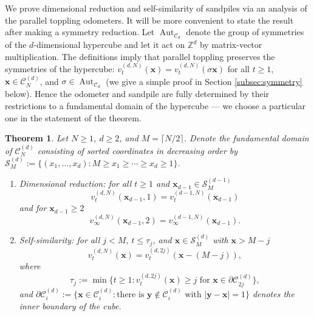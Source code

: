 \documentclass[12pt]{amsart}
\newtheorem{theorem}{Theorem}[section]
\newcommand{\Z}{\mathbb{Z}}
\begin{document}
	
	We prove dimensional reduction and self-similarity of sandpiles
	via an analysis of the parallel toppling odometers.  It will be more convenient to state the result after making a symmetry reduction. 
	 Let $\operatorname{Aut}_{\mathcal{C}_d}$ denote the group of symmetries of the $d$-dimensional hypercube and let it act on $\Z^d$ by matrix-vector multiplication.
	 The definitions imply that parallel toppling preserves the symmetries of the hypercube: 	$v_t^{(d,N)}(\mathbf{x}) = v_t^{(d,N)}( \sigma \mathbf{x})$ for all $t \geq 1$, $\mathbf{x} \in \mathcal{C}_N^{(d)}$, and $ \sigma \in \operatorname{Aut}_{\mathcal{C}_d}$ (we give a simple proof in Section \ref{subsec:symmetry} below).
	 Hence the odometer and sandpile are fully determined by their restrictions to
	a fundamental domain of the hypercube --- we choose a particular one in the statement of the theorem. 
	
	
	\begin{theorem}\label{the_theorem}
		Let $N \geq 1$, $d \geq 2$, and $M = \lceil N/2 \rceil$. Denote the fundamental domain of $\mathcal{C}_N^{(d)}$
		consisting of sorted coordinates in decreasing order by $\mathcal{S}^{(d)}_M := \{ (x_1, \ldots, x_d): M \geq x_1 \geq \cdots \geq x_d \geq 1 \}$.
		
		\begin{enumerate}
			\item{Dimensional reduction:} for all $t \geq 1$ and $\mathbf{x}_{d-1} \in \mathcal{S}_M^{(d-1)}$
			\begin{equation*}
			v_t^{(d, N)}(\mathbf{x}_{d-1}, 1) =  v_t^{(d-1, N)}(\mathbf{x}_{d-1})
			\end{equation*}
			and for $\mathbf{x}_{d-1} \geq 2$ 
			\begin{equation*}
			v_{\infty}^{(d,N)}(\mathbf{x}_{d-1}, 2) =  v_{\infty}^{(d-1,N)}(\mathbf{x}_{d-1}).
			\end{equation*}
			\item{Self-similarity:} for all $j < M$, $t \leq \tau_j$, and $\mathbf{x} \in \mathcal{S}_M^{(d)}$ with $\mathbf{x} > M-j$
			\begin{equation*}
			v_t^{(d, N)}(\mathbf{x}) = v_t^{(d, 2 j)}(\mathbf{x}-(M-j)),
			\end{equation*}
			where 
			\begin{equation*}
			\tau_{j} := \min\{ t \geq 1: v_t^{(d,2 j)}(\mathbf{x}) \geq  j  \mbox{ for $\mathbf{x} \in \partial \mathcal{C}^{(d)}_{2 j}$} \},
			\end{equation*}
			and $\partial \mathcal{C}^{(d)}_i := \{ \mathbf{x} \in \mathcal{C}^{(d)}_i : \mbox{there is $\mathbf{y} \not \in \mathcal{C}^{(d)}_i$ with $|\mathbf{y}-\mathbf{x|} = 1$}\}$ denotes the inner boundary of the cube.
			
		\end{enumerate}
		
		
		
	\end{theorem} 
\end{document}
